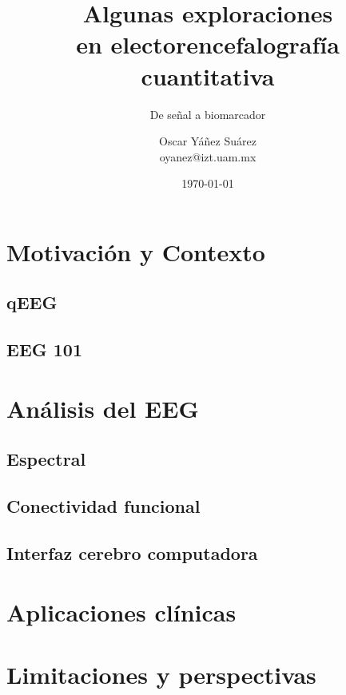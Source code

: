 \documentclass[aspectratio=169, 10pt]{beamer}
\title[qEEG]{Algunas exploraciones \\ en electorencefalografía cuantitativa}
\subtitle{De señal a biomarcador}
\author[OYS]{Oscar Yáñez Suárez\\\small oyanez@izt.uam.mx}
\institute[UAMI]{Ingeniería Eléctrica / UAM Iztapalapa}
\date{\today}
\begin{document}
	
	
	
	\section{Motivación y Contexto}
	\subsection{qEEG}
	
	
	\subsection{EEG 101}
	
	
	
	
	
	
	\section{Análisis del EEG}
	\subsection{Espectral}
	
	
    
    
    
	\subsection{Conectividad funcional}
	
	
	
	
	\subsection{Interfaz cerebro computadora}
	
	
	\section{Aplicaciones clínicas}
	
	
	\section{Limitaciones y perspectivas}
	
	
	
	
	
\end{document}
